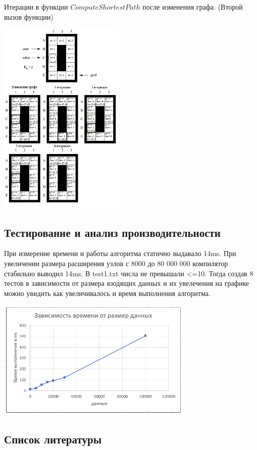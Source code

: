 \documentclass[12pt]{article}
\begin{document}
Итерации в функции $ComputeShortestPath$ после изменения графа. (Второй вызов функции)
    \begin{center}
        \includegraphics[width=0.45\textwidth]{img/robot2.png}
    \end{center}
\newpage  
\begin{center}
   \section*{Тестирование и анализ производительности}
\end{center}
При измерение времени и работы алгоритма статично выдавало 14ms. При увеличении размера расширения узлов с 8000 до 80 000 000 компилятор стабильно выводил 14ms.
В test1.txt числа не превышали <=10. Тогда создав 8 тестов в зависимости от размера взодящих данных и их увелечения на графике можно увидить как увеличивалось и время выполнения алгоритма.
\begin{center}
        \includegraphics[width=0.7\textwidth]{img/datetime.png}
    \end{center}
\newpage  
\begin{center}
   \section*{Список литературы}
\end{center}

\nocite{*}
\printbibliography
\end{document}

